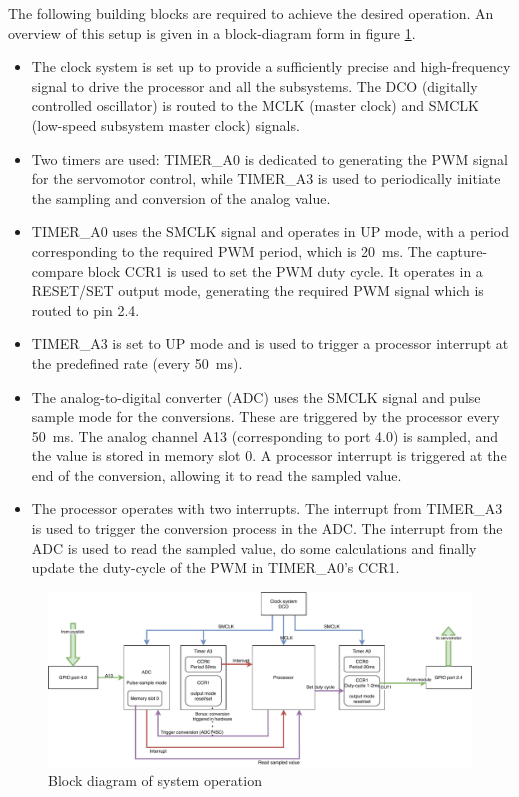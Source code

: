 \documentclass[12pt,a4paper]{article}
\begin{document}
The following building blocks are required to achieve the desired operation. An overview of this setup is given in a block-diagram form in figure \ref{fig:schema}.
\begin{itemize}
\item The clock system is set up to provide a sufficiently precise and high-frequency signal to drive the processor and all the subsystems. The DCO (digitally controlled oscillator) is routed to the MCLK (master clock) and SMCLK (low-speed subsystem master clock) signals.
\item Two timers are used: TIMER\_A0 is dedicated to generating the PWM signal for the servomotor control, while TIMER\_A3 is used to periodically initiate the sampling and conversion of the analog value.
\item TIMER\_A0 uses the SMCLK signal and operates in UP mode, with a period corresponding to the required PWM period, which is \SI{20}{\milli\s}. The capture-compare block CCR1 is used to set the PWM duty cycle. It operates in a RESET/SET output mode, generating the required PWM signal which is routed to pin 2.4.
\item TIMER\_A3 is set to UP mode and is used to trigger a processor interrupt at the predefined rate (every \SI{50}{\milli\s}).
\item The analog-to-digital converter (ADC) uses the SMCLK signal and pulse sample mode for the conversions. These are triggered by the processor every \SI{50}{\milli\s}. The analog channel A13 (corresponding to port 4.0) is sampled, and the value is stored in memory slot 0. A processor interrupt is triggered at the end of the conversion, allowing it to read the sampled value.
\item The processor operates with two interrupts. The interrupt from TIMER\_A3 is used to trigger the conversion process in the ADC. The interrupt from the ADC is used to read the sampled value, do some calculations and finally update the duty-cycle of the PWM in TIMER\_A0's CCR1.
\end{itemize}

\begin{figure}[h]
	\centering
	\includegraphics[width=\linewidth]{block}
	\caption{Block diagram of system operation}
	\label{fig:schema}
\end{figure}
\end{document}
